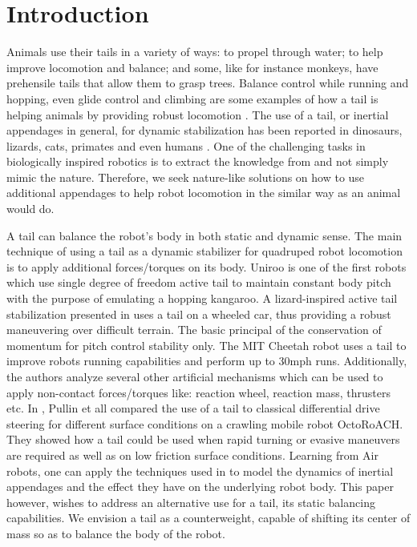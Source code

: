 \section{Introduction}\label{sec:introduction}

Animals use their tails in a variety of ways: to propel through water; to help improve locomotion and balance; and some, like for instance monkeys, have prehensile tails that allow them to grasp trees. Balance control while running and hopping, even glide control and climbing are some examples of how a tail is helping animals by providing robust locomotion \cite{Thomas:Nature2012}. The use of a tail, or inertial appendages in general, for dynamic stabilization has been reported in dinosaurs, lizards, cats, primates and even humans \cite{ostrom1969osteology,PijnappelsSringer,Walker199841,JusufiIOP2010}. One of the challenging tasks in biologically inspired robotics is to extract the knowledge from and not simply mimic the nature. Therefore, we seek nature-like solutions on how to use additional appendages to help robot locomotion in the similar way as an animal would do.  

A tail can balance the robot’s body in both static and dynamic sense. The main technique of using a tail as a dynamic stabilizer for quadruped robot locomotion is to apply additional forces/torques on its body. Uniroo \cite{zeglin1991uniroo} is one of the first robots which use single degree of freedom active tail to maintain constant body pitch with the purpose of emulating a hopping kangaroo. A lizard-inspired active tail stabilization presented in \cite{conf/iros/Chang-SiuLTF11} uses a tail on a wheeled car, thus providing a robust maneuvering over difficult terrain. The basic principal of the conservation of momentum for pitch control stability only. The MIT Cheetah robot \cite{DBLP:conf/iros/BriggsLHK12} uses a tail to improve robots running capabilities and perform up to 30mph runs. Additionally, the authors analyze several other artificial mechanisms which can be used to apply non-contact forces/torques like: reaction wheel, reaction mass, thrusters etc. In \cite{PullinICRA12}, Pullin et all compared the use of a tail to classical differential drive steering for different surface conditions on a crawling mobile robot OctoRoACH. They showed how a tail could be used when rapid turning or evasive maneuvers are required as well as on low friction surface conditions. Learning from Air robots, one can apply the techniques used in \cite{Korpela2013ICRA,Orsag2012JINT} to model the dynamics of inertial appendages and the effect they have on the underlying robot body. This paper however, wishes to address an alternative use for a tail, its static balancing capabilities. We envision a tail as a counterweight, capable of shifting its center of mass so as to balance the body of the robot.

